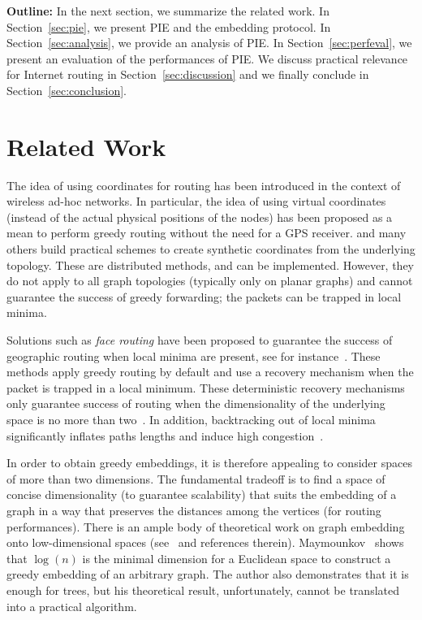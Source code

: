 \documentclass[conference]{IEEEtran}
\begin{document}
\textbf{Outline: }
In the next section, we summarize the related work. In Section~\ref{sec:pie}, we present PIE and the embedding protocol. In Section~\ref{sec:analysis}, we provide an analysis of PIE. 
In Section~\ref{sec:perfeval}, we present an evaluation of the performances of PIE. We discuss practical relevance for Internet routing in Section~\ref{sec:discussion} and we finally conclude in Section~\ref{sec:conclusion}.

\section{Related Work}
\label{sec:rw}
The idea of using coordinates for routing has been introduced in the context of wireless ad-hoc networks. In particular, the idea of using virtual coordinates (instead of the actual physical positions of the nodes) has been proposed as a mean to perform greedy routing without the need for a GPS receiver. \cite{rao:geographic, Dabek:vivaldi} and many others build practical schemes to create synthetic coordinates from the underlying topology. These are distributed methods, and can be implemented. However, they do not apply to all graph topologies (typically only on planar graphs) and cannot guarantee the success of greedy forwarding; the packets can be trapped in local minima.




Solutions such as \emph{face routing} have been proposed to guarantee the success of geographic routing when local minima are present, see for instance~\cite{goafr}.
These methods apply greedy routing by default and use a recovery mechanism when the packet is trapped in a local minimum. These deterministic recovery mechanisms only guarantee success of routing when the dimensionality of the underlying space is no more than two~\cite{durocher:3d}. In addition, backtracking out of local minima significantly inflates paths lengths and induce high congestion~\cite{subramanian:optimal}.



In order to obtain greedy embeddings, it is therefore appealing to consider spaces of more than two dimensions. The fundamental tradeoff is to find a space of concise dimensionality (to guarantee scalability) that suits the embedding of a graph in a way that preserves the distances among the vertices (for routing performances). There is an ample body of theoretical work on graph embedding onto low-dimensional spaces (see~\cite{matousek} and references therein). Maymounkov~\cite{maymounkov:greedy} shows that $\log(n)$ is the minimal dimension for a Euclidean space to construct a greedy embedding of an arbitrary graph. The author also demonstrates that it is enough for trees, but his theoretical result, unfortunately, cannot be translated into a practical algorithm.
\end{document}
